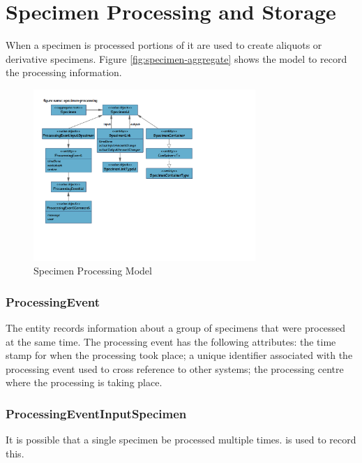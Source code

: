 \chapter{Specimen Processing and Storage}
\label{chap:specimen-processing}

When a specimen is processed portions of it are used to create aliquots or
derivative specimens. Figure \ref{fig:specimen-aggregate} shows the model to
record the processing information.

\begin{figure}[H]
  \centering
  \includegraphics[trim={10mm 42mm 78mm 18mm}, clip,
    width=0.75\textwidth]{images/specimen-processing}
  \caption{Specimen Processing Model}
  \label{fig:specimen-processing}
\end{figure}

\subsection*{ProcessingEvent}
The  entity records information about a group of
specimens that were processed at the same time. The processing event has the
following attributes:  the time stamp for when the
processing took place;  a unique identifier associated with
the processing event used to cross reference to other systems;
 the processing centre where the processing is taking place.

\subsection*{ProcessingEventInputSpecimen}
It is possible that a single specimen be processed multiple
times.  is used to record this.

